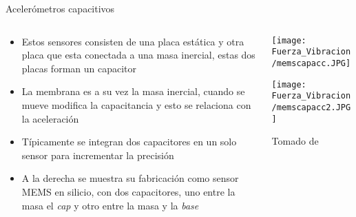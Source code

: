 \documentclass[aspectratio=169]{beamer}
\begin{document}
\begin{frame}{Acelerómetros capacitivos}
    \begin{columns}[c, onlytextwidth]
        \begin{column}{0.65\textwidth}
            \begin{itemize}
                \item Estos sensores consisten de una placa estática y otra placa que esta conectada a una masa inercial, estas dos placas forman un capacitor
                \item La membrana es a su vez la masa inercial, cuando se mueve modifica la capacitancia y esto se relaciona con la aceleración
                \item Típicamente se integran dos capacitores en un solo sensor para incrementar la precisión
                \item A la derecha se muestra su fabricación como sensor MEMS en silicio, con dos capacitores, uno entre la masa el \emph{cap} y otro entre la masa y la \emph{base}
            \end{itemize}
        \end{column}
        \begin{column}{0.35\textwidth}
            \centering
            \texttt{[image: Fuerza\_Vibracion/memscapacc.JPG]}
            
            \texttt{[image: Fuerza\_Vibracion/memscapacc2.JPG]}

            \tiny{Tomado de \cite{Fraden_2016}}
        \end{column}
    \end{columns}
\end{frame}
\end{document}
